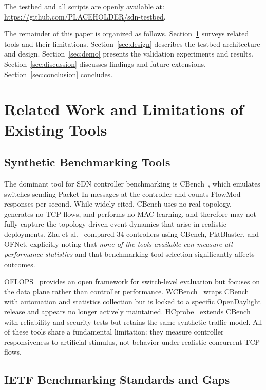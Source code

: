 \documentclass[conference]{IEEEtran}
\begin{document}
The testbed and all scripts are openly available at:
\url{https://github.com/PLACEHOLDER/sdn-testbed}.

The remainder of this paper is organized as follows.
Section~\ref{sec:related} surveys related tools and their
limitations. Section~\ref{sec:design} describes the testbed
architecture and design. Section~\ref{sec:demo} presents the
validation experiments and results. Section~\ref{sec:discussion}
discusses findings and future extensions.
Section~\ref{sec:conclusion} concludes.

\section{Related Work and Limitations of Existing Tools}
\label{sec:related}

\subsection{Synthetic Benchmarking Tools}

The dominant tool for SDN controller benchmarking is
CBench~\cite{cbench2012}, which emulates switches sending
Packet-In messages at the controller and counts FlowMod responses
per second. While widely cited, CBench uses no real topology,
generates no TCP flows, and performs no MAC learning, and
therefore may not fully capture the topology-driven event dynamics
that arise in realistic deployments. Zhu et al.~\cite{zhu2019benchmarking}
compared 34 controllers using CBench, PktBlaster, and OFNet,
explicitly noting that \emph{none of the tools available can
measure all performance statistics} and that benchmarking tool
selection significantly affects outcomes.

OFLOPS~\cite{Rotsos2012OFLOPS} provides an open framework for
switch-level evaluation but focuses on the data plane rather
than controller performance. WCBench~\cite{wcbench2015} wraps
CBench with automation and statistics collection but is locked
to a specific OpenDaylight release and appears no longer actively maintained.
HCprobe~\cite{Shalimov2013HCprobe} extends CBench with
reliability and security tests but retains the same synthetic
traffic model. All of these tools share a fundamental limitation:
they measure controller responsiveness to artificial stimulus,
not behavior under realistic concurrent TCP flows.

\subsection{IETF Benchmarking Standards and Gaps}
\end{document}
